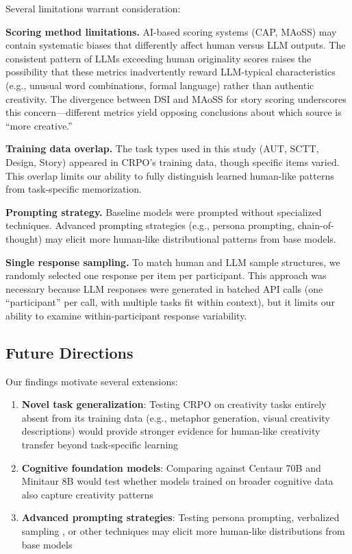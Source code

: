 \documentclass[11pt,twocolumn]{article}
\begin{document}
Several limitations warrant consideration:

\textbf{Scoring method limitations.} AI-based scoring systems (CAP, MAoSS) may contain systematic biases that differently affect human versus LLM outputs. The consistent pattern of LLMs exceeding human originality scores raises the possibility that these metrics inadvertently reward LLM-typical characteristics (e.g., unusual word combinations, formal language) rather than authentic creativity. The divergence between DSI and MAoSS for story scoring underscores this concern---different metrics yield opposing conclusions about which source is ``more creative.''

\textbf{Training data overlap.} The task types used in this study (AUT, SCTT, Design, Story) appeared in CRPO's training data, though specific items varied. This overlap limits our ability to fully distinguish learned human-like patterns from task-specific memorization.

\textbf{Prompting strategy.} Baseline models were prompted without specialized techniques. Advanced prompting strategies (e.g., persona prompting, chain-of-thought) may elicit more human-like distributional patterns from base models.

\textbf{Single response sampling.} To match human and LLM sample structures, we randomly selected one response per item per participant. This approach was necessary because LLM responses were generated in batched API calls (one ``participant'' per call, with multiple tasks fit within context), but it limits our ability to examine within-participant response variability.

\subsection{Future Directions}

Our findings motivate several extensions:

\begin{enumerate}
    \item \textbf{Novel task generalization}: Testing CRPO on creativity tasks entirely absent from its training data (e.g., metaphor generation, visual creativity descriptions) would provide stronger evidence for human-like creativity transfer beyond task-specific learning
    \item \textbf{Cognitive foundation models}: Comparing against Centaur 70B and Minitaur 8B \citep{binz2025centaur} would test whether models trained on broader cognitive data also capture creativity patterns
    \item \textbf{Advanced prompting strategies}: Testing persona prompting, verbalized sampling \citep{zhang2025verbalized}, or other techniques may elicit more human-like distributions from base models
\end{enumerate}
\end{document}

